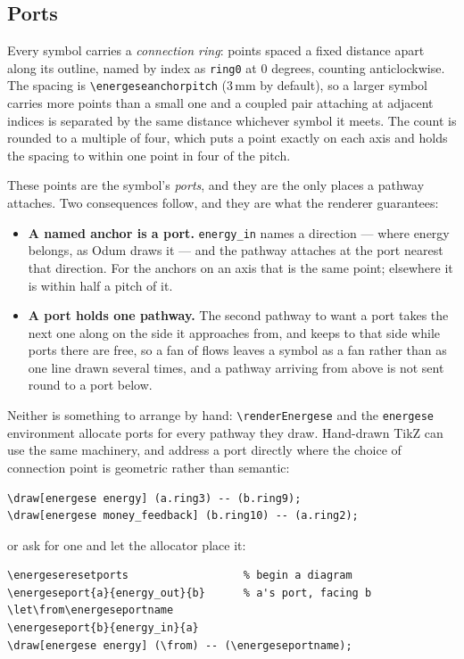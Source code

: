 \documentclass{article}
\begin{document}
\subsection{Ports}
\label{sec:ports}

Every symbol carries a \emph{connection ring}: points spaced a fixed distance
apart along its outline, named by index as \texttt{ring0} at $0$ degrees,
counting anticlockwise. The spacing is \verb|\energeseanchorpitch| ($3$\,mm by
default), so a larger symbol carries more points than a small one and a coupled
pair attaching at adjacent indices is separated by the same distance whichever
symbol it meets. The count is rounded to a multiple of four, which puts a point
exactly on each axis and holds the spacing to within one point in four of the
pitch.

These points are the symbol's \emph{ports}, and they are the only places a
pathway attaches. Two consequences follow, and they are what the renderer
guarantees:

\begin{itemize}
\item \textbf{A named anchor is a port.} \texttt{energy\_in} names a direction
--- where energy belongs, as Odum draws it --- and the pathway attaches at the
port nearest that direction. For the anchors on an axis that is the same point;
elsewhere it is within half a pitch of it.
\item \textbf{A port holds one pathway.} The second pathway to want a port
takes the next one along on the side it approaches from, and keeps to that side
while ports there are free, so a fan of flows leaves a symbol as a fan rather
than as one line drawn several times, and a pathway arriving from above is not
sent round to a port below.
\end{itemize}

Neither is something to arrange by hand: \verb|\renderEnergese| and the
\texttt{energese} environment allocate ports for every pathway they draw.
Hand-drawn TikZ can use the same machinery, and address a port directly where
the choice of connection point is geometric rather than semantic:

\begin{verbatim}
\draw[energese energy] (a.ring3) -- (b.ring9);
\draw[energese money_feedback] (b.ring10) -- (a.ring2);
\end{verbatim}

\noindent or ask for one and let the allocator place it:

\begin{verbatim}
\energeseresetports                  % begin a diagram
\energeseport{a}{energy_out}{b}      % a's port, facing b
\let\from\energeseportname
\energeseport{b}{energy_in}{a}
\draw[energese energy] (\from) -- (\energeseportname);
\end{verbatim}
\end{document}
